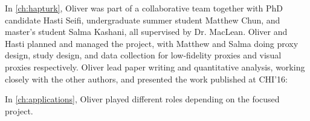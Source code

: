 

\noindent
In \autoref{ch:hapturk}, Oliver was part of a collaborative team together with PhD candidate Hasti Seifi, undergraduate summer student Matthew Chun, and master's student Salma Kashani, all supervised by Dr. MacLean.
Oliver and Hasti planned and managed the project, with Matthew and Salma doing proxy design, study design, and data collection for low-fidelity proxies and visual proxies respectively.
Oliver lead paper writing and quantitative analysis, working closely with the other authors, and presented the work published at CHI'16:


\noindent
In \autoref{ch:applications}, Oliver played different roles depending on the focused project.
